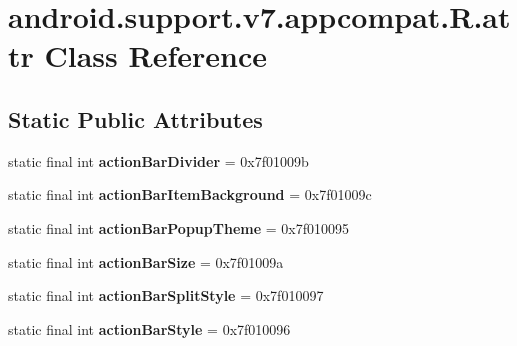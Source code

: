 \hypertarget{classandroid_1_1support_1_1v7_1_1appcompat_1_1_r_1_1attr}{}\section{android.\+support.\+v7.\+appcompat.\+R.\+attr Class Reference}
\label{classandroid_1_1support_1_1v7_1_1appcompat_1_1_r_1_1attr}
\subsection*{Static Public Attributes}
\begin{DoxyCompactItemize}
\item 
\hypertarget{classandroid_1_1support_1_1v7_1_1appcompat_1_1_r_1_1attr_ac6a2c7ce44a2166d7e14504e8190c672}{}static final int {\bfseries action\+Bar\+Divider} = 0x7f01009b\label{classandroid_1_1support_1_1v7_1_1appcompat_1_1_r_1_1attr_ac6a2c7ce44a2166d7e14504e8190c672}

\item 
\hypertarget{classandroid_1_1support_1_1v7_1_1appcompat_1_1_r_1_1attr_ace1846ddd415909e0bae74f1522ac978}{}static final int {\bfseries action\+Bar\+Item\+Background} = 0x7f01009c\label{classandroid_1_1support_1_1v7_1_1appcompat_1_1_r_1_1attr_ace1846ddd415909e0bae74f1522ac978}

\item 
\hypertarget{classandroid_1_1support_1_1v7_1_1appcompat_1_1_r_1_1attr_a7e95d0cc1919198b7bf4225527179c2d}{}static final int {\bfseries action\+Bar\+Popup\+Theme} = 0x7f010095\label{classandroid_1_1support_1_1v7_1_1appcompat_1_1_r_1_1attr_a7e95d0cc1919198b7bf4225527179c2d}

\item 
\hypertarget{classandroid_1_1support_1_1v7_1_1appcompat_1_1_r_1_1attr_a6c7ea35aa7f4c203811b01339aba964e}{}static final int {\bfseries action\+Bar\+Size} = 0x7f01009a\label{classandroid_1_1support_1_1v7_1_1appcompat_1_1_r_1_1attr_a6c7ea35aa7f4c203811b01339aba964e}

\item 
\hypertarget{classandroid_1_1support_1_1v7_1_1appcompat_1_1_r_1_1attr_ae16c62a7c9c666348989192343ce0449}{}static final int {\bfseries action\+Bar\+Split\+Style} = 0x7f010097\label{classandroid_1_1support_1_1v7_1_1appcompat_1_1_r_1_1attr_ae16c62a7c9c666348989192343ce0449}

\item 
\hypertarget{classandroid_1_1support_1_1v7_1_1appcompat_1_1_r_1_1attr_a1758457942ab79be3d337a155a829ee7}{}static final int {\bfseries action\+Bar\+Style} = 0x7f010096\label{classandroid_1_1support_1_1v7_1_1appcompat_1_1_r_1_1attr_a1758457942ab79be3d337a155a829ee7}


\end{DoxyCompactItemize}
